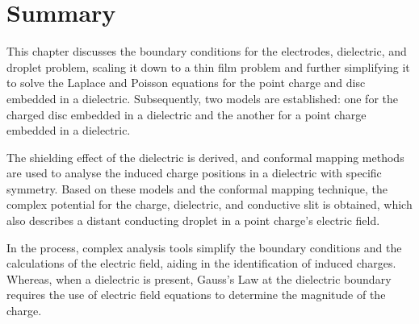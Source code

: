 \section{Summary}
    \hspace{0em}\indent This chapter discusses the boundary conditions for the electrodes, dielectric, and droplet problem, scaling it down to a thin film problem and further simplifying it to solve the Laplace and Poisson equations for the point charge and disc embedded in a dielectric. Subsequently, two models are established: one for the charged disc embedded in a dielectric and the another for a point charge embedded in a dielectric. 
    
    The shielding effect of the dielectric is derived, and conformal mapping methods are used to analyse the induced charge positions in a dielectric with specific symmetry. Based on these models and the conformal mapping technique, the complex potential for the charge, dielectric, and conductive slit is obtained, which also describes a distant conducting droplet in a point charge's electric field.
    
    In the process, complex analysis tools simplify the boundary conditions and the calculations of the electric field, aiding in the identification of induced charges. Whereas, when a dielectric is present, Gauss's Law at the dielectric boundary requires the use of electric field equations to determine the magnitude of the charge.
